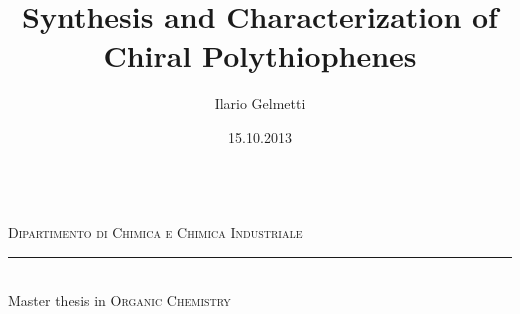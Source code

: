 \documentclass[a4paper,12pt,openright]{book}
\title{Synthesis and Characterization of Chiral Polythiophenes}
\author{Ilario Gelmetti}
\date{15.10.2013}
\begin{document}
\pagestyle{plain}

\frontmatter

{\let\cleardoublepage\clearpage %

\begin{titlepage}\begin{center}



	\\%
	\medskip
	\large{\textsc{Dipartimento di Chimica e Chimica Industriale}}\\
		\rule{5cm}{1pt}\\
	{
\smallskip
	{Master thesis in \textsc{Organic Chemistry}}}\\
\vfill


\end{center}
\end{titlepage}}
\end{document}
